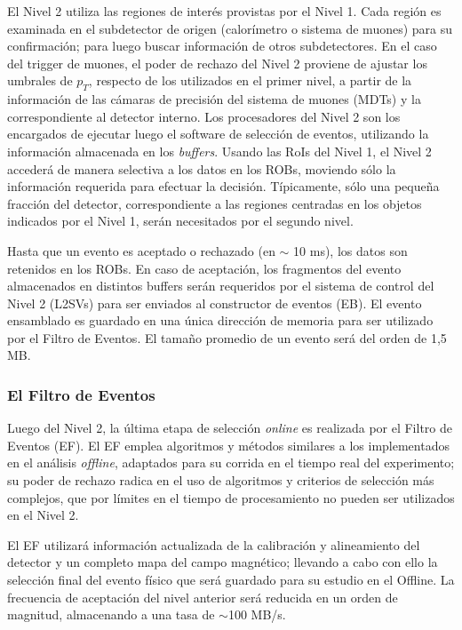    El Nivel 2 utiliza las regiones de inter\'es provistas por el Nivel 1. Cada regi\'on es examinada en el subdetector de origen (calor\'imetro o sistema de muones) para su confirmaci\'on; para luego buscar informaci\'on de otros subdetectores. En el caso del trigger de muones, el poder de rechazo del Nivel 2 proviene de ajustar los umbrales de $p_{T}$, respecto de los utilizados en el primer nivel, a partir de la informaci\'on de las c\'amaras de precisi\'on del sistema de muones (MDTs) y la correspondiente al detector interno.
Los procesadores del Nivel 2 son los encargados de ejecutar luego el software de selecci\'on de eventos, utilizando la informaci\'on almacenada en los \emph{buffers}. Usando las RoIs del Nivel 1, el Nivel 2 acceder\'a de manera selectiva a los datos en los ROBs, moviendo s\'olo la informaci\'on requerida para efectuar la decisi\'on. T\'ipicamente, s\'olo una peque\~na fracci\'on del detector, correspondiente a las regiones centradas en los objetos indicados por el Nivel 1, ser\'an necesitados por el segundo nivel.

  Hasta que un evento es aceptado o rechazado (en $\sim$ 10 ms), los datos son retenidos en los ROBs. En caso de aceptaci\'on, los fragmentos del evento almacenados en distintos buffers ser\'an requeridos por el sistema de control del Nivel 2 (L2SVs) para ser enviados al constructor de eventos (EB). El evento ensamblado es guardado en una \'unica direcci\'on de memoria para ser utilizado por el Filtro de Eventos. El tama\~no promedio de un evento ser\'a del orden de 1,5 MB.


\subsubsection{El Filtro de Eventos}

  Luego del Nivel 2, la \'ultima etapa de selecci\'on \emph{online} es realizada por el Filtro de Eventos (EF). El EF emplea algoritmos y m\'etodos similares a los implementados en el an\'alisis \emph{offline}, adaptados para su corrida en el tiempo real del experimento; su poder de rechazo radica en el uso de algoritmos y criterios de selecci\'on m\'as complejos, que por l\'imites en el tiempo de procesamiento no pueden ser utilizados en el Nivel 2.
  
  El EF utilizar\'a informaci\'on actualizada de la calibraci\'on y alineamiento del detector y un completo mapa del campo magn\'etico; llevando a cabo con ello la selecci\'on final del evento f\'isico que ser\'a guardado para su estudio en el Offline. La frecuencia de aceptaci\'on del nivel anterior ser\'a reducida en un orden de magnitud, almacenando a una tasa de $\sim$100 MB/s.


